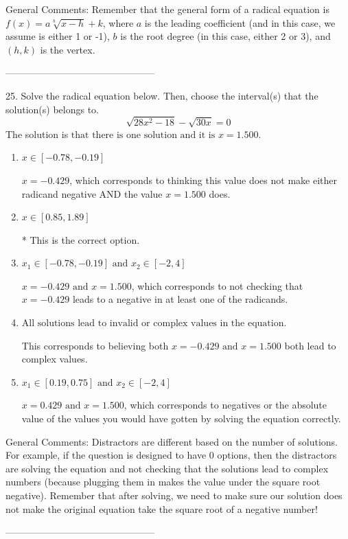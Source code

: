 \documentclass{article}[14pt]
\begin{document}
General Comments: Remember that the general form of a radical equation is $ f(x) = a \sqrt[b]{x - h} + k $, where $a$ is the leading coefficient (and in this case, we assume is either 1 or -1), $b$ is the root degree (in this case, either 2 or 3), and $(h, k)$ is the vertex.

-----------------------------------------------

25. Solve the radical equation below. Then, choose the interval(s) that the solution(s) belongs to.
$$ \sqrt{28 x^2 - 18} - \sqrt{30 x} = 0 $$ 
The solution is $ \text{that there is one solution and it is } x = 1.500. $ 

\begin{enumerate}[label=\Alph*.] 
\item $ x \in [-0.78,-0.19] $ 

 $x = -0.429$, which corresponds to thinking this value does not make either radicand negative AND the value $x = 1.500$ does. 
\item $ x \in [0.85,1.89] $ 

 * This is the correct option. 
\item $ x_1 \in [-0.78, -0.19] \text{ and } x_2 \in [-2,4] $ 

 $x = -0.429 \text{ and } x = 1.500$, which corresponds to not checking that $x = -0.429$ leads to a negative in at least one of the radicands. 
\item $ \text{All solutions lead to invalid or complex values in the equation.} $ 

 This corresponds to believing both $x = -0.429 \text{ and } x = 1.500$ both lead to complex values. 
\item $ x_1 \in [0.19, 0.75] \text{ and } x_2 \in [-2,4] $ 

 $x = 0.429 \text{ and } x = 1.500$, which corresponds to negatives or the absolute value of the values you would have gotten by solving the equation correctly. 
\end{enumerate} 
 
General Comments: Distractors are different based on the number of solutions. For example, if the question is designed to have 0 options, then the distractors are solving the equation and not checking that the solutions lead to complex numbers (because plugging them in makes the value under the square root negative). Remember that after solving, we need to make sure our solution does not make the original equation take the square root of a negative number!

-----------------------------------------------
\end{document}

